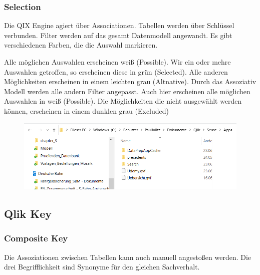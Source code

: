 \subsubsection{Selection}
Die QIX Engine agiert über Associationen. Tabellen werden über Schlüssel verbunden. Filter werden auf das gesamt Datenmodell angewandt. Es gibt verschiedenen Farben, die die Auswahl markieren.

Alle möglichen Auswahlen erscheinen weiß (Possible). Wir ein oder mehre Auswahlen getroffen, so erscheinen diese in grün (Selected). Alle anderen Möglichkeiten erscheinen in einem leichten grau (Altnative). Durch das Assoziativ Modell werden alle andern Filter angepasst. Auch hier erscheinen alle möglichen Auswahlen in weiß (Possible). Die Möglichkeiten die nicht ausgewählt werden können, erscheinen in einem dunklen grau (Excluded)
\begin{figure}[H]
	\centering
	\includegraphics[scale = 0.3]{attachment/chapter_3/Scc018}
	\caption{}
	\label{fig:Scc018}
\end{figure}

\subsection{Qlik Key} 
\subsubsection{Composite Key} 
Die Assoziationen zwischen Tabellen kann auch manuell angestoßen werden. Die drei Begrifflichkeit sind Synonyme für den gleichen Sachverhalt.

